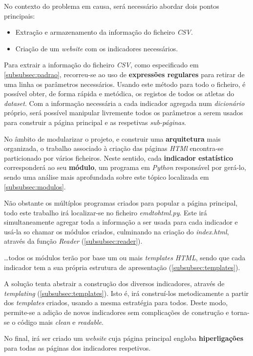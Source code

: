 No contexto do problema em causa, será necessário abordar dois pontos principais:
\begin{itemize}
    \item Extração e armazenamento da informação do ficheiro \textit{CSV}.
    \item Criação de um \textit{website} com os indicadores necessários.
\end{itemize}

Para extrair a informação do ficheiro \textit{CSV}, como especificado em \ref{subsubsec:padrao}, recorreu-se ao uso de \textbf{expressões regulares} para retirar
de uma linha os parâmetros necessários.
Usando este método para todo o ficheiro, é possível obter, de forma rápida e metódica, os registos de todos os atletas 
do \textit{dataset}.
Com a informação necessária a cada indicador agregada num \textit{dicionário} próprio, será possível manipular 
livremente todos os parâmetros a serem usados para construir a página principal e as respetivas \textit{sub-páginas}.

No âmbito de modularizar o projeto, e construir uma \textbf{arquitetura} mais organizada, o trabalho associado à criação das páginas \textit{HTMl} encontra-se 
particionado por vários ficheiros. 
Neste sentido, cada \textbf{indicador estatístico} corresponderá ao seu \textbf{módulo}, um programa em \textit{Python} responsável por gerá-lo, sendo uma análise mais aprofundada
sobre este tópico localizada em \ref{subsubsec:modulos}.

Não obstante os múltíplos programas criados para popular a página principal, todo este trabalho irá localizar-se no ficheiro \textit{emdtohtml.py}. 
Este irá simultaneamente agregar toda a informação a ser usada para cada indicador e usá-la so chamar os módulos criados, culminando na criação do 
\textit{index.html}, através da função \textit{Reader} (\ref{subsubsec:reader}). 

\dots todos os módulos terão por base um ou mais \textit{templates HTML}, sendo que cada indicador tem a sua própria estrutura de apresentação (\ref{subsubsec:templates}).

A solução tenta abstrair a construção dos diversos indicadores, através de \textit{templating} (\ref{subsubsec:templates}).
Isto é, irá construí-los metodicamente a partir dos \textit{templates} criados, usando a mesma estratégia para todos.
Deste modo, permite-se a adição de novos indicadores sem complicações de construção e torna-se o código mais \textit{clean} e \textit{readable}.

No final, irá ser criado um \textit{website} cuja página principal engloba \textbf{hiperligações} para todas as páginas dos indicadores respetivos.